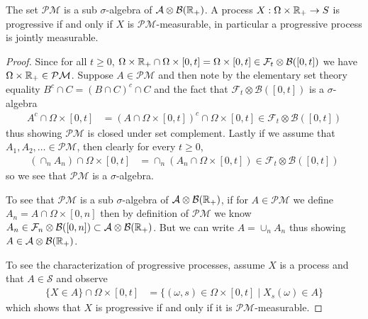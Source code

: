 \begin{lem}\label{ProgressivelyMeasurableProcesses}The set $\mathcal{P}\mathcal{M}$ is a sub $\sigma$-algebra
  of $\mathcal{A} \otimes \mathcal{B}(\mathbb{R}_+)$.  A process $X :
  \Omega \times \mathbb{R}_+ \to S$ is progressive if and only if $X$ is
  $\mathcal{P}\mathcal{M}$-measurable, in particular a progressive
  process is jointly measurable.
\end{lem}
\begin{proof}
Since for all $t\geq 0$, $\Omega \times \mathbb{R}_+ \cap \Omega \times
[0,t] = \Omega \times [0,t] \in \mathcal{F}_t  \otimes
\mathcal{B}([0,t])$ we have $\Omega \times \mathbb{R}_+ \in
\mathcal{P}\mathcal{M}$.  Suppose $A \in \mathcal{P}\mathcal{M}$ and
then note by the elementary set theory equality $B^c \cap C = (B \cap
C)^c \cap C$ and the fact that $\mathcal{F}_t \otimes
\mathcal{B}([0,t])$ is a $\sigma$-algebra
\begin{align*}
A^c \cap \Omega \times [0,t] &= (A \cap \Omega \times [0,t])^c \cap
\Omega \times [0,t] \in \mathcal{F}_t \otimes \mathcal{B}([0,t])
\end{align*}
thus showing $\mathcal{P}\mathcal{M}$ is closed under set complement.
Lastly if we assume that $A_1, A_2, \dots \in \mathcal{P}\mathcal{M}$,
then clearly  for every $t \geq 0$,
\begin{align*}
\left (\cap_n A_n \right )\cap \Omega \times [0,t] &= \cap_n \left (
  A_n \cap \Omega \times [0,t]\right ) \in \mathcal{F}_t \otimes \mathcal{B}([0,t])
\end{align*}
so we see that $\mathcal{P}\mathcal{M}$ is a $\sigma$-algebra.

To see that $\mathcal{P}\mathcal{M}$ is a sub $\sigma$-algebra of
$\mathcal{A} \otimes \mathcal{B}(\mathbb{R}_+)$, 
if for $A \in \mathcal{P}\mathcal{M}$ we define $A_n = A \cap \Omega
\times [0,n]$ then by definition of $\mathcal{P}\mathcal{M}$ we know
$A_n \in \mathcal{F}_n \otimes \mathcal{B}([0,n]) \subset \mathcal{A}
\otimes \mathcal{B}(\mathbb{R}_+)$.  But we can write $A = \cup_n A_n $
thus showing $A \in \mathcal{A}
\otimes \mathcal{B}(\mathbb{R}_+)$.

To see the characterization of progressive processes, assume $X$ is a
process and that $A
\in \mathcal{S}$ and observe
\begin{align*}
\lbrace X \in A \rbrace \cap \Omega \times [0,t] &= \lbrace (\omega,
s) \in \Omega \times [0,t] \mid X_s(\omega) \in A \rbrace
\end{align*}
which shows that $X$ is progressive if and only if it is $\mathcal{P}\mathcal{M}$-measurable.
\end{proof}

